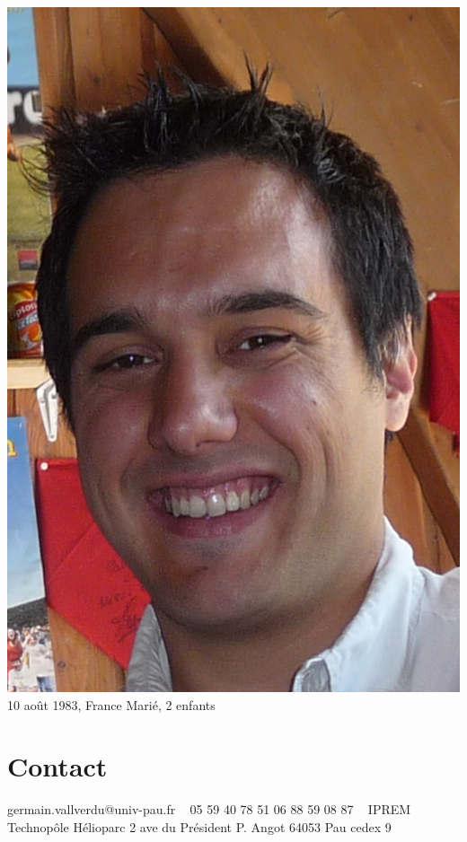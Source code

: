 \documentclass[french]{cv-style}      %
\begin{document}
\lastupdated


\begin{aside}
    \includegraphics[width=.9\columnwidth]{img/germain}
    10 août 1983, France
    Marié, 2 enfants
    \section{Contact}
    germain.vallverdu@univ-pau.fr
    ~
    05 59 40 78 51
    06 88 59 08 87
    ~
    IPREM
    Technopôle Hélioparc
    2 ave du Président P. Angot
    64053 Pau cedex 9

\end{aside}
\end{document}
